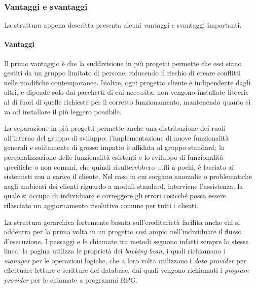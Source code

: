 \subsubsection{Vantaggi e svantaggi}
La struttura appena descritta presenta alcuni vantaggi e svantaggi importanti.
\paragraph{Vantaggi}
Il primo vantaggio è che la suddivisione in più progetti permette che essi siano gestiti da un gruppo limitato di persone, riducendo il rischio di creare conflitti nelle modifiche contemporanee. Inoltre, ogni progetto cliente è indipendente dagli altri, e dipende solo dai pacchetti di cui necessita: non vengono installate librerie al di fuori di quelle richieste per il corretto funzionamento, mantenendo quanto si va ad installare il più leggero possibile.

La separazione in più progetti permette anche una distribuzione dei ruoli all'interno del gruppo di sviluppo: l'implementazione di nuove funzionalità generali e solitamente di grosso impatto è affidata al gruppo standard; la personalizzazione delle funzionalità esistenti e lo sviluppo di funzionalità specifiche o non comuni, che quindi risulterebbero utili a pochi, è lasciato ai sistemisti con a carico il cliente. Nel caso in cui sorgano anomalie o problematiche negli ambienti dei clienti riguardo a moduli standard, interviene l'assistenza, la quale si occupa di individuare e correggere gli errori cosicché possa essere rilasciato un aggiornamento risolutivo comune per tutti i clienti.

La struttura gerarchica fortemente basata sull'ereditarietà facilita anche chi si addentra per la prima volta in un progetto così ampio nell'individuare il flusso d'esecuzione. I passaggi e le chiamate tra metodi seguono infatti sempre la stessa linea: la pagina utilizza le proprietà dei \textit{backing bean}, i quali richiamano i \textit{manager} per le operazioni logiche, che a loro volta utilizzano i \textit{data provider} per effettuare letture e scritture del database, dai quali vengono richiamati i \textit{program provider} per le chiamate a programmi RPG. 

